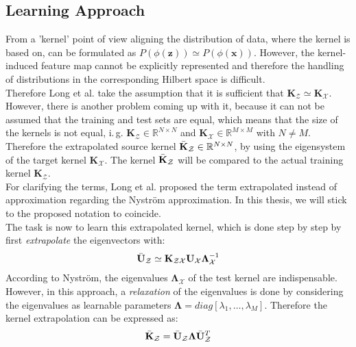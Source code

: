 \subsection{Learning Approach}\label{InSubSecLearnApp}
From a 'kernel' point of view aligning the distribution of data, where the kernel is based on, can be formulated as $P(\phi(\mathbf{z})) \simeq P(\phi(\mathbf{x}))$.\cite{Long.2015}
However, the kernel-induced feature map cannot be explicitly represented and therefore the handling of distributions in the corresponding Hilbert space is difficult.\cite{KaiZhang.2013}\\
Therefore Long et al. take the assumption that it is sufficient that $\mathbf{K}_\mathcal{Z} \simeq \mathbf{K}_\mathcal{X}$.
However, there is another problem coming up with it, because it can not be assumed that the training and test sets are equal, which means that the size of the kernels is not equal, i.\,g. $\mathbf{K}_\mathcal{Z} \in \mathbb{R}^{N\times N}$ and $\mathbf{K}_\mathcal{X} \in \mathbb{R}^{M\times M}$ with $N \neq M$.
Therefore the extrapolated source kernel $\bar{\mathbf{K}}_\mathcal{Z} \in \mathbb{R}^{N\times N}$, by using the eigensystem of the target kernel $\mathbf{K}_\mathcal{X}$. The kernel  $\bar{\mathbf{K}}_\mathcal{Z} $ will be compared to the actual training kernel $\mathbf{K}_\mathcal{Z}$.\cite{Long.2015}\\
For clarifying the terms, Long et al. proposed the term extrapolated instead of approximation regarding the Nyström approximation.\cite{Long.2015}
In this thesis, we will stick to the proposed notation to coincide.\\
The task is now to learn this extrapolated kernel, which is done step by step by first \textit{extrapolate} the eigenvectors with:\cite{Long.2015}
\begin{equation}\label{EqExtraEigs}
	\bar{\mathbf{U}}_\mathcal{Z} \simeq \mathbf{K}_\mathcal{ZX}\mathbf{U}_\mathcal{X} \boldsymbol{\Lambda}_\mathcal{X}^{-1}
\end{equation}
According to Nyström, the eigenvalues $\boldsymbol{\Lambda}_\mathcal{X}$ of the test kernel are indispensable.
However, in this approach, a \textit{relaxation} of the eigenvalues is done by considering the eigenvalues as learnable parameters $\boldsymbol{\Lambda} = diag[\lambda_1,\dots,\lambda_{M}]$.
Therefore the kernel extrapolation can be expressed as:\cite{Long.2015}
\begin{equation}
	\bar{\mathbf{K}}_\mathcal{Z} = \bar{\mathbf{U}}_\mathcal{Z} \boldsymbol{\Lambda} \bar{\mathbf{U}}_\mathcal{Z}^T
\end{equation}
